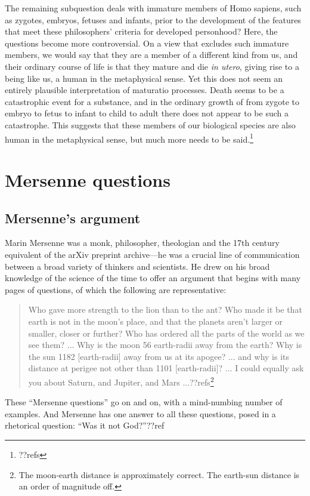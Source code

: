 The remaining subquestion deals with immature members of Homo sapiens, such as zygotes, embryos, fetuses and infants, prior to the
development of the features that meet these philosophers' criteria for developed personhood? Here, the questions become 
more controversial.
On a view that excludes such immature members, we would say that they are a member of a different kind from us, and
their ordinary course of life is that they mature and die \textit{in utero}, giving
rise to a being like us, a human in the metaphysical sense. Yet this does not seem an entirely plausible
interpretation of maturatio processes. Death seems to be a catastrophic event for a substance, and in the ordinary
growth of from zygote to embryo to fetus to infant to child to adult 
there does not appear to be such a catastrophe. This suggests that these members of our biological species are also human in the metaphysical sense, but much
more needs to be said.\footnote{??refs}

\section{Mersenne questions}
\subsection{Mersenne's argument}
Marin Mersenne was a monk, philosopher, theologian and the 17th century equivalent of the arXiv preprint archive---he was 
a crucial line of communication between a broad variety of thinkers and scientists. He drew on his broad knowledge of
the science of the time to offer an argument that begins with many pages of questions, of which the following are
representative:
\begin{quote}
Who gave more strength to the lion than to the ant?
Who made it be that earth is not in the moon's place, and that the planets aren't larger or smaller, closer or further?
Who has ordered all the parts of the world as we see them?
...
Why is the moon 56 earth-radii away from the earth? Why is the sun 1182 [earth-radii] away from us at its apogee? ... and why is its distance at perigee not other than 1101 [earth-radii]? ...
I could equally ask you about Saturn, and Jupiter, and Mars ...??refs\footnote{The moon-earth distance is approximately correct.
The earth-sun distance is an order of magnitude off.}
\end{quote}
These ``Mersenne questions'' go on and on, with a mind-numbing number of examples. And Mersenne has one answer to all
these questions, posed in a rhetorical question: ``Was it not God?''??ref

